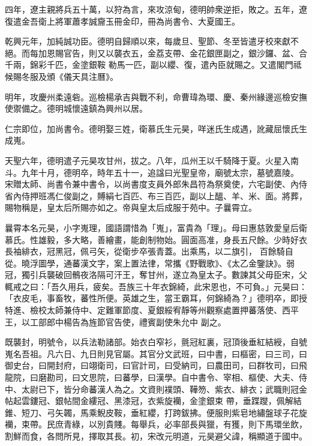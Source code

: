 \begin{pinyinscope}
 四年，遼主親將兵五十萬，以狩為言，來攻涼甸，德明帥衆逆拒，敗之。五年，遼復遣金吾衛上將軍蕭孝誠齎玉冊金印，冊為尚書令、大夏國王。



 乾興元年，加純誠功臣。德明自歸順以來，每歲旦、聖節、冬至皆遣牙校來獻不絕。而每加恩賜官告，則又以襲衣五，金荔支帶、金花銀匣副之，銀沙鑼、盆、合千兩，錦彩千匹，金塗銀鞍
 勒馬一匹，副以纓、復，遣內臣就賜之。又遣閣門祗候賜冬服及頒《儀天具注曆》。



 明年，攻慶州柔遠砦。巡檢楊承吉與戰不利，命曹瑋為環、慶、秦州緣邊巡檢安撫使禦備之。德明城懷遠鎮為興州以居。



 仁宗即位，加尚書令。德明娶三姓，衛慕氏生元昊，咩迷氏生成遇，訛藏屈懷氏生成嵬。



 天聖六年，德明遣子元昊攻甘州，拔之。八年，瓜州王以千騎降于夏。火星入南斗。九年十月，德明卒，時年五十一，追諡曰光聖皇帝，廟號太宗，墓號嘉陵。
 宋贈太師、尚書令兼中書令，以尚書度支員外郎朱昌符為祭奠使，六宅副使、內侍省內侍押班馮仁俊副之，賻絹七百匹、布三百匹，副以上醞、羊、米、面。將葬，賜物稱是，皇太后所賜亦如之。帝與皇太后成服于苑中。子曩霄立。



 曩霄本名元昊，小字嵬理，國語謂惜為「嵬」，富貴為「理」。母曰惠慈敦愛皇后衛慕氏。性雄毅，多大略，善繪畫，能創制物始。圓面高准，身長五尺餘。少時好衣長袖緋衣，冠黑冠，佩弓矢，從衛步卒張青蓋。出乘馬，以二旗引，
 百餘騎自從。曉浮圖學，通蕃漢文字，案上置法律，常攜《野戰歌》、《太乙金鑒訣》。弱冠，獨引兵襲破回鶻夜洛隔可汗王，奪甘州，遂立為皇太子。數諫其父毋臣宋，父輒戒之曰：「吾久用兵，疲矣。吾族三十年衣錦綺，此宋恩也，不可負。」元昊曰：「衣皮毛，事畜牧，蕃性所便。英雄之生，當王霸耳，何錦綺為？」德明卒，即授特進、檢校太師兼侍中、定難軍節度、夏銀綏宥靜等州觀察處置押蕃落使、西平王，以工部郎中楊告為旌節官告使，禮賓副使朱允中
 副之。



 既襲封，明號令，以兵法勒諸部。始衣白窄衫，氈冠紅裏，冠頂後垂紅結綬，自號嵬名吾祖。凡六日、九日則見官屬。其官分文武班，曰中書，曰樞密，曰三司，曰御史台，曰開封府，曰翊衛司，曰官計司，曰受納司，曰農田司，曰群牧司，曰飛龍院，曰磨勘司，曰文思院，曰蕃學，曰漢學。自中書令、宰相、樞使、大夫、侍中、太尉已下，皆分命蕃漢人為之。文資則襆頭、鞾笏、紫衣、緋衣；武職則冠金帖起雲鏤冠、銀帖間金縷冠、黑漆冠，衣紫旋襽，金塗銀束
 帶，垂蹀躞，佩解結錐、短刀、弓矢韣，馬乘鯢皮鞍，垂紅纓，打跨鈸拂。便服則紫皂地繡盤球子花旋襽，束帶。民庶青綠，以別貴賤。每舉兵，必率部長與獵，有獲，則下馬環坐飲，割鮮而食，各問所見，擇取其長。初，宋改元明道，元昊避父諱，稱顯道于國中。




\end{pinyinscope}
